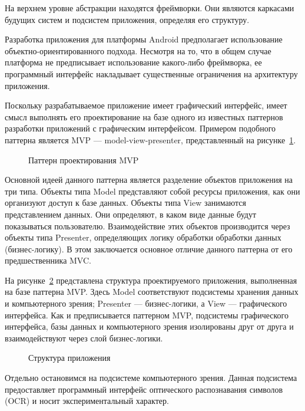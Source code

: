 На верхнем уровне абстракции находятся фреймворки.
Они являются каркасами будущих систем и подсистем приложения, определяя его структуру.

Разработка приложения для платформы Android предполагает использование
объектно-ориентированного подхода. Несмотря на то, что в общем случае
платформа не предписывает использование какого-либо фреймворка,
ее программный интерфейс накладывает существенные ограничения на
архитектуру приложения.

Поскольку разрабатываемое приложение имеет графический интерфейс,
имеет смысл выполнять его проектирование на базе одного из известных паттернов
разработки приложений с графическим интерфейсом. Примером подобного паттерна
является MVP --- model-view-presenter, представленный на
рисунке~\ref{fig:design_mvp}.

\begin{figure}[h!]
  \centering
  \caption{Паттерн проектирования MVP}
  \label{fig:design_mvp}
\end{figure}

Основной идеей данного паттерна является разделение объектов приложения на три типа.
Объекты типа Model представляют собой ресурсы приложения, как они организуют доступ
к базе данных. Объекты типа View занимаются представлением данных. Они определяют,
в каком виде данные будут показываться пользователю. Взаимодействие этих объектов
производится через объекты типа Presenter, определяющих логику обработки
обработки данных (бизнес-логику). В этом заключается основное отличие данного паттерна от
его предшественника MVC.

На рисунке~\ref{fig:design_main} представлена структура проектируемого приложения,
выполненная на базе паттерна MVP.
Здесь Model соответствуют подсистемы хранения данных и компьютерного зрения;
Presenter --- бизнес-логики, а View --- графического интерфейса.
Как и предписывается паттерном MVP, подсистемы графического интерфейса,
базы данных и компьютерного зрения изолированы друг от друга и взаимодействуют
через слой бизнес-логики.

\begin{figure}[h!]
  \centering
  \caption{Структура приложения}
  \label{fig:design_main}
\end{figure}

Отдельно остановимся на подсистеме компьютерного зрения.
Данная подсистема предоставляет программный интерфейс оптического распознавания
символов (OCR) и носит экспериментальный характер.

